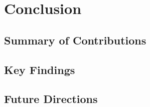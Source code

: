 
\chapter{Conclusion} %

\label{Chapter7} %


\section{Summary of Contributions}


\section{Key Findings}


\section{Future Directions}


